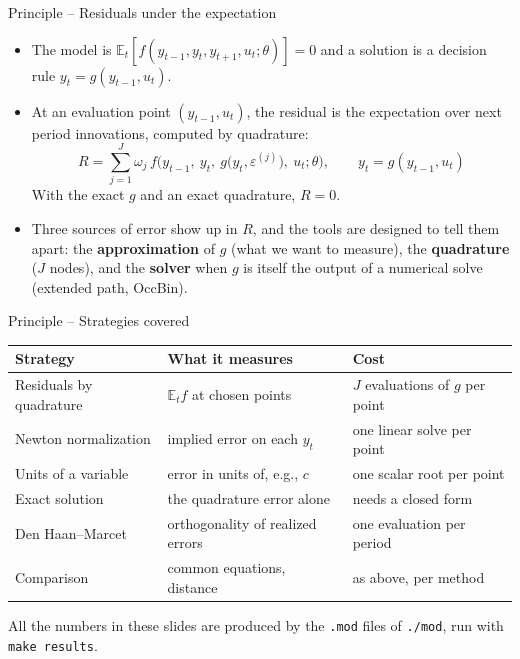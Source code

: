 \documentclass[11pt,aspectratio=169]{beamer}
\newcommand{\E}{\mathbb{E}}
\newcommand{\code}[1]{\texttt{#1}}
\begin{document}
\begin{frame}{Principle -- Residuals under the expectation}

\begin{itemize}

\item The model is $\E_t\left[f(y_{t-1}, y_t, y_{t+1}, u_t;\theta)\right] = 0$ and a solution is a decision rule $y_t = g(y_{t-1}, u_t)$.\newline

\item At an evaluation point $(y_{t-1}, u_t)$, the residual is the expectation over next period innovations, computed by quadrature:
  \[
  \boxed{R = \sum_{j=1}^{J}\omega_j\, f\Big(y_{t-1},\ y_t,\ g\big(y_t, \varepsilon^{(j)}\big),\ u_t;\theta\Big),\qquad y_t = g(y_{t-1},u_t)}
  \]
  With the exact $g$ and an exact quadrature, $R=0$.\newline

\item Three sources of error show up in $R$, and the tools are designed to tell them apart: the \textbf{approximation} of $g$ (what we want to measure), the \textbf{quadrature} ($J$ nodes), and the \textbf{solver} when $g$ is itself the output of a numerical solve (extended path, OccBin).

\end{itemize}

\end{frame}

\begin{frame}{Principle -- Strategies covered}

\begin{center}
    \small
    \renewcommand{\arraystretch}{1.3}
    \begin{tabular}{lll}
        \toprule
        Strategy & What it measures & Cost \\
        \midrule
        Residuals by quadrature & $\E_t f$ at chosen points & $J$ evaluations of $g$ per point \\
        Newton normalization & implied error on each $y_t$ & one linear solve per point \\
        Units of a variable & error in units of, e.g., $c$ & one scalar root per point \\
        Exact solution & the quadrature error alone & needs a closed form \\
        Den Haan--Marcet & orthogonality of realized errors & one evaluation per period \\
        Comparison & common equations, distance & as above, per method \\
        \bottomrule
    \end{tabular}
\end{center}

All the numbers in these slides are produced by the \code{.mod} files of \code{./mod}, run with \code{make results}.

\end{frame}
\end{document}
